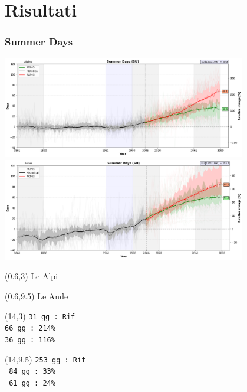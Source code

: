 \section{Risultati}
\setlength{\TPboxrulesize}{0pt}

\begin{frame}
\frametitle{Summer Days}
\begin{center}

{\includegraphics[width=0.8\textwidth]{risultati/su_Alpine_Models_ts_lim_120}} 
{\includegraphics[width=0.8\textwidth]{risultati/su_Andes_Models_ts_lim_120}}
\end{center}

{ \scriptsize
  \begin{textblock}{1.8}(0.6,3)
     {\color{gray} Le Alpi}
  \end{textblock}
}

{ \scriptsize
  \begin{textblock}{1.8}(0.6,9.5)
     {\color{gray} Le Ande}
  \end{textblock}
}


{ \tiny
  \begin{textblock}{3}(14,3)
     {\color{CadetBlue}   \texttt{31 gg : Rif}} \\
     {\color{red}         \texttt{66 gg : 214\% }}\\
     {\color{ForestGreen} \texttt{36 gg : 116\% }}
  \end{textblock}
}

{ \tiny
  \begin{textblock}{3}(14,9.5)
     {\color{CadetBlue}   \texttt{253 gg : Rif}} \\
     {\color{red}         \texttt{ 84 gg : 33\% }} \\
     {\color{ForestGreen} \texttt{ 61 gg : 24\%  }}
  \end{textblock}
}




\end{frame}

